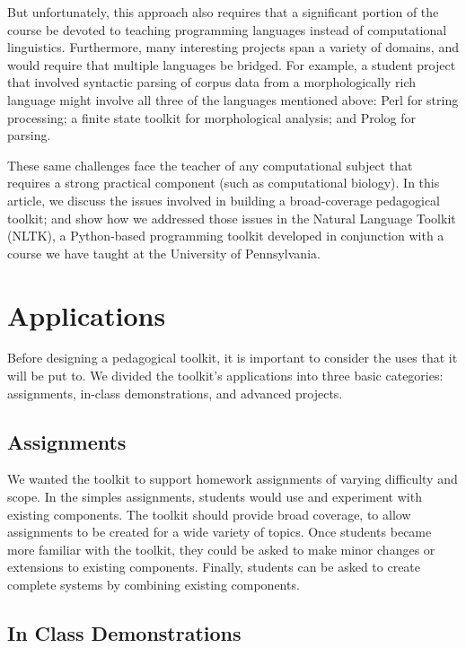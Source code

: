 \documentclass{article}
\begin{document}
But unfortunately, this approach also requires that a significant
portion of the course be devoted to teaching programming languages
instead of computational linguistics.  Furthermore, many interesting
projects span a variety of domains, and would require that multiple
languages be bridged.  For example, a student project that involved
syntactic parsing of corpus data from a morphologically rich language
might involve all three of the languages mentioned above: Perl for
string processing; a finite state toolkit for morphological analysis;
and Prolog for parsing.  

These same challenges face the teacher of any computational subject
that requires a strong practical component (such as computational
biology).  In this article, we discuss the issues involved in building
a broad-coverage pedagogical toolkit; and show how we addressed those
issues in the Natural Language Toolkit (NLTK), a Python-based
programming toolkit developed in conjunction with a course we have
taught at the University of Pennsylvania.

\section{Applications}

Before designing a pedagogical toolkit, it is important to consider
the uses that it will be put to.  We divided the toolkit's applications
into three basic categories: assignments, in-class demonstrations, and
advanced projects.

\subsection{Assignments}

We wanted the toolkit to support homework assignments of varying
difficulty and scope.  In the simples assignments, students would use
and experiment with existing components.  The toolkit should provide
broad coverage, to allow assignments to be created for a wide variety
of topics.  Once students became more familiar with the toolkit, they
could be asked to make minor changes or extensions to existing
components.  Finally, students can be asked to create complete systems
by combining existing components.

\subsection{In Class Demonstrations}
\end{document}
